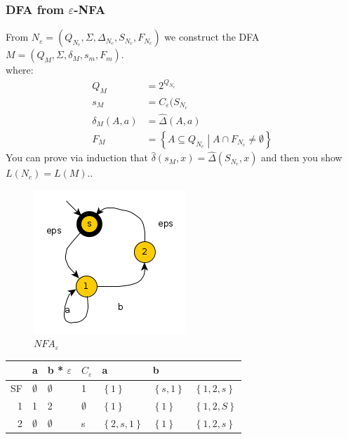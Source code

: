 \documentclass[a4paper]{article}
\begin{document}
        \subsubsection{DFA from $\varepsilon$-NFA}
        From $N_\varepsilon = \left( Q_{N_c}, \Sigma, \Delta_{N_c}, S_{N_c}, F_{N_c} \right)$
        we construct the DFA $M=\left(Q_M, \Sigma, \delta_M, s_m, F_m\right)$.\\
        where:
        \begin{align*}
            Q_M&=2^{Q_{N_c}}\\
            s_M&=C_\varepsilon(S_{N_c}\\
            \delta_M(A,a)&=\hat{\Delta}(A,a)\\
            F_M&=\left\{ A\subseteq Q_{N_c}\middle | A\cap F_{N_c} \neq \emptyset \right\}
        \end{align*}
        You can prove via induction that $\hat{\delta}(s_M,x)=\hat{\Delta}(S_{N_c},x)$
        and then you show $L(N_c)=L(M).$.
        \begin{figure}[H]
            \centering
            \includegraphics{nfaeps.png}
            \caption{$NFA_\varepsilon$}
            \label{fig:nfaeps}
        \end{figure}
        \begin{table}[H]
            \centering
            \begin{tabular}{r|l l|l|l| l l}
                & a & b * $\varepsilon$ & $C_\varepsilon$ & a & b\\\hline
                SF & $\emptyset$ & $\emptyset$ & 1 & $\left\{ 1 \right\}$ & $\left\{ s,1 \right\}$ & $\left\{  1,2,s\right\}$\\
                1 & 1 & 2 & $\emptyset$ & $\left\{ 1 \right\}$ &$\left\{ 1 \right\}$ & $\left\{ 1,2,S \right\}$\\
                2 & $\emptyset$ & $\emptyset$ & s & $\left\{ 2,s,1 \right\}$ & $\left\{ 1 \right\}$ & $\left\{ 1,2,s \right\}$
            \end{tabular}
        \end{table}
\end{document}
